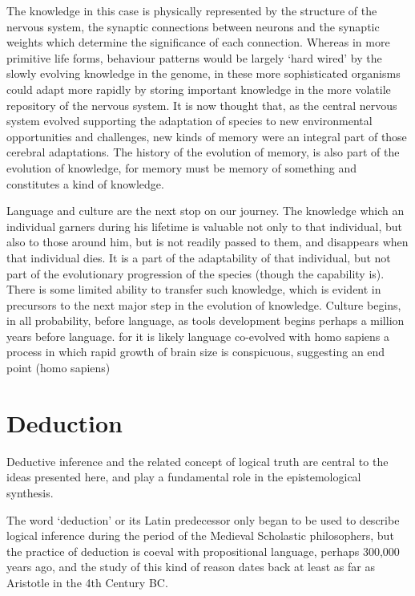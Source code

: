 \documentclass[10pt,titlepage]{book}
\begin{document}
The knowledge in this case is physically represented by the structure of the nervous system, the synaptic connections between neurons and the synaptic weights which determine the significance of each connection.
Whereas in more primitive life forms, behaviour patterns would be largely `hard wired' by the slowly evolving knowledge in the genome, in these more sophisticated organisms could adapt more rapidly by storing important knowledge in the more volatile repository of the nervous system.
It is now thought that, as the central nervous system evolved supporting the adaptation of species to new environmental opportunities and challenges, new kinds of memory were an integral part of those cerebral adaptations.
The history of the evolution of memory, is also part of the evolution of knowledge, for memory must be memory of something and constitutes a kind of knowledge.

Language and culture are the next stop on our journey.
The knowledge which an individual garners during his lifetime is valuable not only to that individual, but also to those around him, but is not readily passed to them, and disappears when that individual dies.
It is a part of the adaptability of that individual, but not part of the evolutionary progression of the species (though the capability is).
There is some limited ability to transfer such knowledge, which is evident in precursors to the next major step in the evolution of knowledge.
Culture begins, in all probability, before language, as tools development begins perhaps a million years before language.
for it is likely language co-evolved with homo sapiens a process in which rapid growth of brain size is conspicuous, suggesting an end point (homo sapiens) 

\chapter{Deduction}\label{ChapDeduction}

Deductive inference and the related concept of logical truth are central to the ideas presented here, and play a fundamental role in the epistemological synthesis.

The word `deduction' or its Latin predecessor only began to be used to describe logical inference during the period of the Medieval Scholastic philosophers, but the practice of deduction is coeval with propositional language, perhaps 300,000 years ago, and the study of this kind of reason dates back at least as far as Aristotle in the 4th Century BC.
\end{document}
